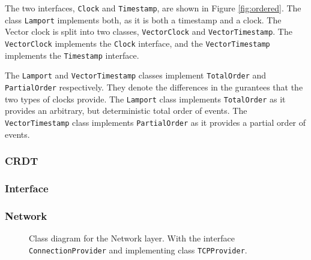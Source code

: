 \documentclass[12pt]{article}
\begin{document}
The two interfaces, \texttt{Clock} and \texttt{Timestamp}, are shown in Figure \ref{fig:ordered}. The class \texttt{Lamport} implements both, as it is both a timestamp and a clock. The Vector clock is split into two classes, \texttt{VectorClock} and \texttt{VectorTimestamp}. The \texttt{VectorClock} implements the \texttt{Clock} interface, and the \texttt{VectorTimestamp} implements the \texttt{Timestamp} interface. \par

The \texttt{Lamport} and \texttt{VectorTimestamp} classes implement \texttt{TotalOrder} and \texttt{PartialOrder} respectively. They denote the differences in the gurantees that the two types of clocks provide. The \texttt{Lamport} class implements \texttt{TotalOrder} as it provides an arbitrary, but deterministic total order of events. The \texttt{VectorTimestamp} class implements \texttt{PartialOrder} as it provides a partial order of events. \par

\subsubsection{CRDT}

\subsubsection{Interface}

\subsubsection{Network}

\begin{figure}[h]
    \centering
    \caption{Class diagram for the Network layer. With the interface \texttt{ConnectionProvider} and implementing class \texttt{TCPProvider}.}
    \label{fig:connection}
\end{figure}
\end{document}

